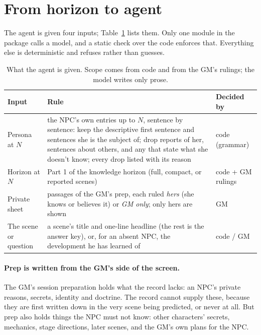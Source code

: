 \documentclass[11pt]{article}
\begin{document}
\section{From horizon to agent}\label{sec:agent}

The agent is given four inputs; Table~\ref{tab:inputs} lists them. Only one module in
the package calls a model, and a static check over the code enforces that. Everything
else is deterministic and refuses rather than guesses.

\begin{table}[t]
\centering
\small
\begin{tabularx}{\linewidth}{@{}lXl@{}}
\toprule
Input & Rule & Decided by \\
\midrule
Persona at $N$ & the NPC's own entries up to $N$, sentence by sentence: keep the descriptive first sentence and sentences she is the subject of; drop reports of her, sentences about others, and any that state what she doesn't know; every drop listed with its reason & code (grammar) \\
Horizon at $N$ & Part 1 of the knowledge horizon (full, compact, or reported scenes) & code + GM rulings \\
Private sheet & passages of the GM's prep, each ruled \emph{hers} (she knows or believes it) or \emph{GM only}; only hers are shown & GM \\
The scene or question & a scene's title and one-line headline (the rest is the answer key), or, for an absent NPC, the development he has learned of & code / GM \\
\bottomrule
\end{tabularx}
\caption{What the agent is given. Scope comes from code and from the GM's rulings;
the model writes only prose.}
\label{tab:inputs}
\end{table}

\paragraph{Prep is written from the GM's side of the screen.}
The GM's session preparation holds what the record lacks: an NPC's private reasons,
secrets, identity and doctrine. The record cannot supply these, because they are first
written down in the very scene being predicted, or never at all. But prep also holds
things the NPC must not know: other characters' secrets, mechanics, stage directions,
later scenes, and the GM's own plans for the NPC.
\end{document}
